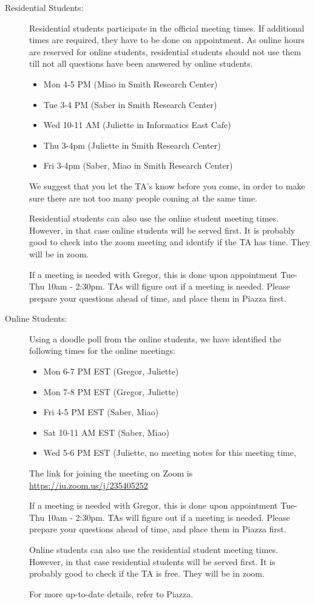 \begin{description}
\item[Residential Students:]
Residential students participate in the official meeting times. If
additional times are required, they have to be done on appointment. As
online hours are reserved for online students, residential students
should not use them till not all questions have been answered by online
students.

\begin{itemize}
\tightlist
\item
  Mon 4-5 PM (Miao in Smith Research Center)
\item
  Tue 3-4 PM (Saber in Smith Research Center)
\item
  Wed 10-11 AM (Juliette in Informatics East Cafe)
\item
  Thu 3-4pm (Juliette in Smith Research Center)
\item
  Fri 3-4pm (Saber, Miao in Smith Research Center)
\end{itemize}

We suggest that you let the TA's know before you come, in order to make
sure there are not too many people coming at the same time.

Residential students can also use the online student meeting times.
However, in that case online students will be served first. It is
probably good to check into the zoom meeting and identify if the TA has
time. They will be in zoom.

If a meeting is needed with Gregor, this is done upon appointment
Tue-Thu 10am - 2:30pm. TAs will figure out if a meeting is needed.
Please prepare your questions ahead of time, and place them in Piazza
first.
\item[Online Students:]
Using a doodle poll from the online students, we have identified the
following times for the online meetings:

\begin{itemize}
\tightlist
\item
  Mon 6-7 PM EST (Gregor, Juliette)
\item
  Mon 7-8 PM EST (Gregor, Juliette)
\item
  Fri 4-5 PM EST (Saber, Miao)
\item
  Sat 10-11 AM EST (Saber, Miao)
\item
  Wed 5-6 PM EST (Juliette, no meeting notes for this meeting time,
\end{itemize}

The link for joining the meeting on Zoom is
\url{https://iu.zoom.us/j/235405252}

If a meeting is needed with Gregor, this is done upon appointment
Tue-Thu 10am - 2:30pm. TAs will figure out if a meeting is needed.
Please prepare your questions ahead of time, and place them in Piazza
first.

Online students can also use the residential student meeting times.
However, in that case residential students will be served first. It is
probably good to check if the TA is free. They will be in zoom.

For more up-to-date details, refer to Piazza.
\end{description}
